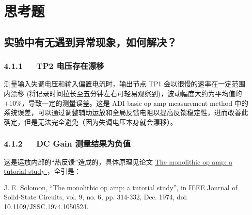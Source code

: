 \documentclass[UTF8]{article}
\begin{document}
\newpage
\section{思考题}


\subsection{实验中有无遇到异常现象，如何解决？}

\subsubsection*{4.1.1\ \ \ TP2 电压存在漂移}

测量输入失调电压和输入偏置电流时，输出节点 TP1 会以很慢的速率在一定范围内漂移 (将记录时间拉长至五分钟左右可轻易观察到)，波动幅度大约为平均值的 $\pm 10 \%$，导致一定的测量误差。这是 ADI basic op amp measurement method 中的系统误差，可以通过调整辅助运放和全局反馈电阻以提高反馈稳定性，进而改善此确定，但是无法完全避免（因为失调电压本身就会漂移）。



\subsubsection*{4.1.2\ \ \ DC Gain 测量结果为负值}

这是运放内部的“热反馈”造成的，具体原理见论文 %
\href{https://ieeexplore.ieee.org/document/1050524
}{ %
The monolithic op amp: a tutorial study
}，全引是：
\vspace*{-3mm}
\begin{graybox}
J. E. Solomon, ``The monolithic op amp: a tutorial study'', in IEEE Journal of Solid-State Circuits, vol. 9, no. 6, pp. 314-332, Dec. 1974, doi: 10.1109/JSSC.1974.1050524.
\end{graybox}
\end{document}

